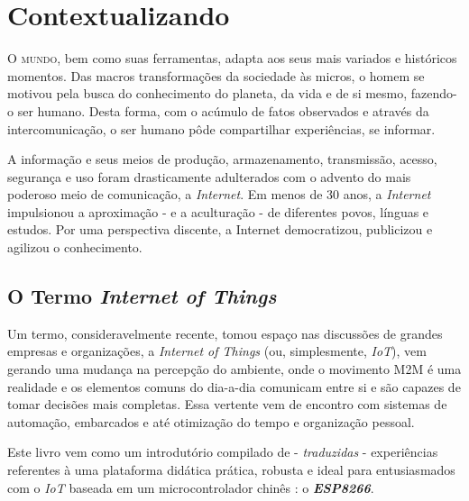 \documentclass[
	10pt,				%
	openright,			%
	twoside,			%
	a5paper,			%
	english,			%
	french,				%
	spanish,			%
	brazil,				%
	sumario=tradicional
]{abntex2}
\begin{document}


\chapter{Contextualizando}
  
  \lettrine[nindent=0.35em,lhang=0.40,loversize=0.3]{O}{ mundo}, bem como suas ferramentas, adapta aos seus mais variados e históricos momentos. Das macros transformações da sociedade às micros, o homem se motivou pela busca do conhecimento do planeta, da vida e de si mesmo, fazendo-o ser humano. Desta forma, com o acúmulo de fatos observados e através da intercomunicação, o ser humano pôde compartilhar experiências, se informar.
  
  A informação e seus meios de produção, armazenamento, transmissão, acesso, segurança e  uso foram drasticamente adulterados com o advento do mais poderoso meio de comunicação, a \textit{Internet}. Em menos de 30 anos, a \textit{Internet} impulsionou a aproximação - e a aculturação - de diferentes povos, línguas e estudos. Por uma perspectiva discente, a Internet democratizou, publicizou e agilizou o conhecimento. 

\section{O Termo \textit{Internet of Things}}

Um termo, consideravelmente recente, tomou espaço nas discussões de grandes empresas e organizações, a \textit{Internet of Things} (ou, simplesmente, \textit{IoT}), vem gerando uma mudança na percepção do ambiente, onde o movimento M2M é uma realidade e os elementos comuns do dia-a-dia comunicam entre si e são capazes de tomar decisões mais completas. Essa vertente vem de encontro com sistemas de automação, embarcados e até otimização do tempo e organização pessoal.

Este livro vem como um introdutório compilado de - \textit{traduzidas} - experiências referentes à uma plataforma didática prática, robusta e ideal para entusiasmados com o \textit{IoT} baseada em um microcontrolador chinês : o \textit{\textbf{ESP8266}}.
\end{document}
